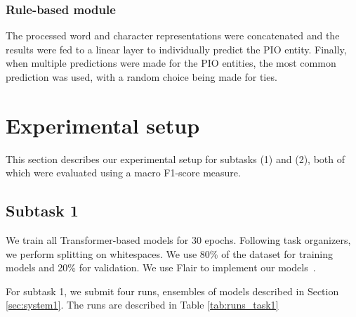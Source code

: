 \documentclass[11pt]{article}
\begin{document}
\subsubsection{Rule-based module}
\label{subsec:t2_rules}
%
The processed word and character representations were concatenated and the results were fed to a linear layer to individually predict the PIO entity.
Finally, when multiple predictions were made for the PIO entities, the most common prediction was used, with a random choice being made for ties.
%
%
%
\section{Experimental setup}
\label{sec:exp_setup}
%
This section describes our experimental setup for subtasks (1) and (2), both of which were evaluated using a macro F1-score measure.
%
%
%
%
%
%
\subsection{Subtask 1}
\label{sec:setup_t1}
%
We train all Transformer-based models for 30 epochs. 
Following task organizers, we perform splitting on whitespaces.
We use 80\% of the dataset for training models and 20\% for validation.
We use Flair to implement our models~\cite{Akbik2019FLAIRAE}.

For subtask 1, we submit four runs, ensembles of models described in Section \ref{sec:system1}. The runs are described in Table \ref{tab:runs_task1}
\end{document}
